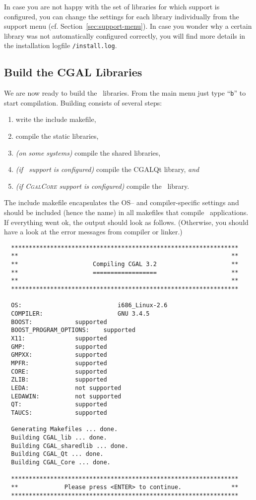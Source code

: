 In case you are not happy with the set of libraries for which support
is configured, you can change the settings for each library
individually from the support menu (cf.
Section~\ref{sec:support-menu}). In case you wonder why a certain
library was not automatically configured correctly, you will find more
details in the installation logfile \texttt{\cgaldir/install.log}.

\subsection{Build the CGAL Libraries\label{sec:build-the-libs}}

We are now ready to build the \cgal\ libraries. From the main menu
just type ``{\tt b}'' to start compilation. Building consists of
several steps:
\begin{enumerate}
\item write the include makefile,
\item compile the static libraries,
\item \textit{(on some systems)} compile the shared libraries,
\item \textit{(if \qt\ support is configured)} compile the CGALQt
  library, \textit{and}
\item \textit{(if \textsc{CgalCore} support is configured)} compile
  the \core\ library.
\end{enumerate}
The include makefile encapsulates the OS-- and
compiler-specific settings and should be included (hence the name) in
all makefiles that compile \cgal\ applications. If everything went ok,
the output should look as follows. (Otherwise, you should have a look
at the error messages from compiler or linker.)

{\ccTexHtml{\scriptsize}{}
\begin{verbatim}
  ****************************************************************
  **                                                            **
  **                     Compiling CGAL 3.2                     **
  **                     ==================                     **
  **                                                            **
  ****************************************************************

  OS:                           i686_Linux-2.6
  COMPILER:                     GNU 3.4.5
  BOOST:			supported
  BOOST_PROGRAM_OPTIONS:	supported
  X11:				supported
  GMP:				supported
  GMPXX:			supported
  MPFR:				supported
  CORE:				supported
  ZLIB:				supported
  LEDA:				not supported
  LEDAWIN:			not supported
  QT:				supported
  TAUCS:			supported

  Generating Makefiles ... done.
  Building CGAL_lib ... done.
  Building CGAL_sharedlib ... done.
  Building CGAL_Qt ... done.
  Building CGAL_Core ... done.

  ****************************************************************
  **             Please press <ENTER> to continue.              **
  ****************************************************************
\end{verbatim}}
{
}

